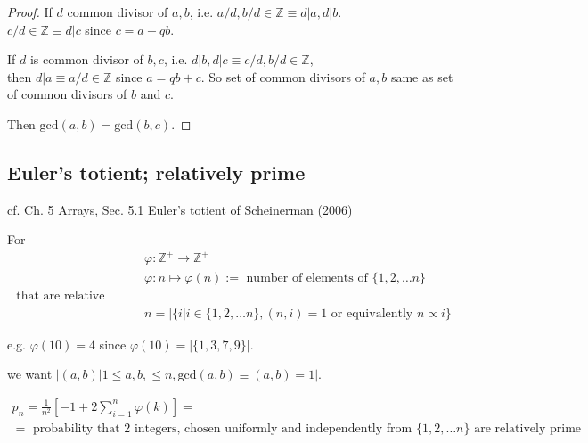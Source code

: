 \documentclass[10pt]{amsart}
\newtheorem{definition}{Definition}
\begin{document}
\begin{multicols*}{2}
\begin{proof}
If $d$ common divisor of $a,b$, i.e. $a/d, b/d \in \mathbb{Z} \equiv d|a, d|b$.   \\
$c/d \in \mathbb{Z} \equiv d|c$ since $c=a-qb$.  

If $d$ is common divisor of $b,c$, i.e. $d|b, d|c \equiv c/d, b/d\in\mathbb{Z}$, \\
then $d|a \equiv a/d \in \mathbb{Z}$ since $a=qb+c$.  So set of common divisors of $a,b$ same as set of common divisors of $b$ and $c$.  

Then $\text{gcd}(a,b) = \text{gcd}(b,c)$.  
\end{proof}




\subsection{Euler's totient; relatively prime}


cf. Ch. 5 Arrays, Sec. 5.1 Euler's totient of Scheinerman (2006) \cite{Sche2006}

For 
\[
\begin{aligned}
	& \varphi : \mathbb{Z}^+ \to \mathbb{Z}^+ \\ 
	& \varphi : n \mapsto \varphi(n) := \text{ number of elements of } \lbrace 1,2, \dots n \rbrace \\
	\text{ that are relative prime to } \\
	& n = | \lbrace i | i \in \lbrace 1,2, \dots n \rbrace , (n,i)=1 \text{ or equivalently } n \propto i \rbrace |
\end{aligned}
\]

e.g. $\varphi(10) = 4$ since $\varphi(10) = | \lbrace 1,3,7,9\rbrace|$.  

we want $|(a,b) | 1 \leq a,b, \leq n , \text{gcd}(a,b) \equiv (a,b) = 1 |$.  

\[
\begin{gathered}
p_n = \frac{1}{n^2} \left[ -1 + 2\sum_{i=1}^n \varphi(k) \right] = \\
= \text{ probability that 2 integers, chosen uniformly and independently from $\lbrace 1,2,\dots n\rbrace$ are relatively prime }
\end{gathered}
\]


\end{multicols*}
\end{document}
